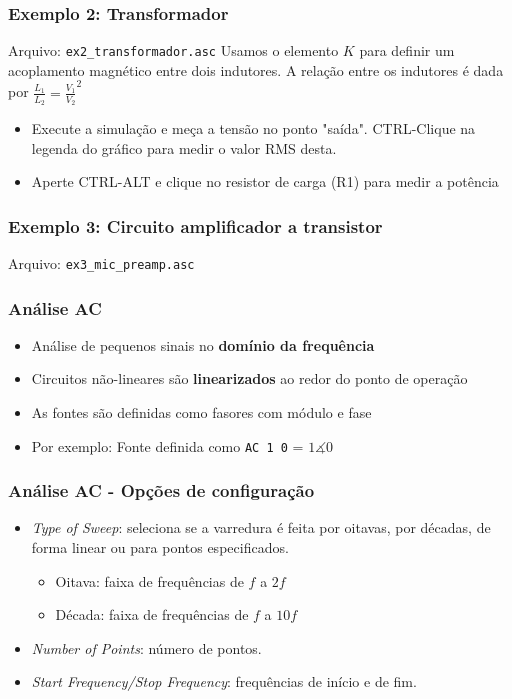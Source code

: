 \documentclass{beamer}
\begin{document}
\begin{frame}
\frametitle{Exemplo 2: Transformador}
Arquivo: \texttt{ex2\_transformador.asc}
Usamos o elemento $K$ para definir um acoplamento magnético entre dois indutores. 
A relação entre os indutores é dada por $\frac{L_1}{L_2} = \frac{V_1}{V_2}^2$
\begin{itemize}
\item{Execute a simulação e meça a tensão no ponto "saída". CTRL-Clique na legenda do gráfico para medir o valor RMS desta}.
\item{Aperte CTRL-ALT e clique no resistor de carga (R1) para medir a potência}
\end{itemize}
\end{frame}

\begin{frame}
\frametitle{Exemplo 3: Circuito amplificador a transistor}
Arquivo: \texttt{ex3\_mic\_preamp.asc}
\end{frame}

\begin{frame}
\frametitle{Análise AC}
\begin{itemize}
\item{Análise de pequenos sinais no \textbf{domínio da frequência}}
\item{Circuitos não-lineares são \textbf{linearizados} ao redor do ponto de operação}
\item{As fontes são definidas como fasores com módulo e fase}
\item{Por exemplo: Fonte definida como \texttt{AC 1 0} = $1\measuredangle 0$} 
\end{itemize}
\end{frame}

\begin{frame}
\frametitle{Análise AC - Opções de configuração}
\begin{itemize}
\item{\textit{Type of Sweep}}: seleciona se a varredura é feita por oitavas, por décadas, de forma linear ou para pontos especificados.
\begin{itemize}
\item{Oitava}: faixa de frequências de $f$ a $2 f$
\item{Década}: faixa de frequências de $f$ a $10 f$
\end{itemize}
\item{\textit{Number of Points}}: número de pontos.
\item{\textit{Start Frequency/Stop Frequency}}: frequências de início e de fim.
\end{itemize}
\end{frame}
\end{document}

